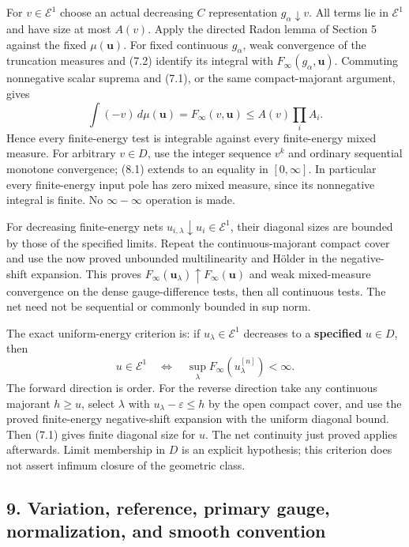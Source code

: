\documentclass[
]{article}
\begin{document}
For \(v\in\mathcal E^1\) choose an actual decreasing \(C\)
representation \(g_\alpha\downarrow v\). All terms lie in
\(\mathcal E^1\) and have size at most \(A(v)\). Apply the directed
Radon lemma of Section 5 against the fixed \(\mu(\boldsymbol u)\). For
fixed continuous \(g_\alpha\), weak convergence of the truncation
measures and (7.2) identify its integral with
\(F_\infty(g_\alpha,\boldsymbol u)\). Commuting nonnegative scalar
suprema and (7.1), or the same compact-majorant argument, gives
\[\int(-v)\,d\mu(\boldsymbol u)=F_\infty(v,\boldsymbol u)\le A(v)\prod_iA_i.\tag{8.1}\]
Hence every finite-energy test is integrable against every finite-energy
mixed measure. For arbitrary \(v\in D\), use the integer sequence
\(v^k\) and ordinary sequential monotone convergence; (8.1) extends to
an equality in \([0,\infty]\). In particular every finite-energy input
pole has zero mixed measure, since its nonnegative integral is finite.
No \(\infty-\infty\) operation is made.

For decreasing finite-energy nets
\(u_{i,\lambda}\downarrow u_i\in\mathcal E^1\), their diagonal sizes are
bounded by those of the specified limits. Repeat the continuous-majorant
compact cover and use the now proved unbounded multilinearity and Hölder
in the negative-shift expansion. This proves
\(F_\infty(\boldsymbol u_\lambda)\uparrow F_\infty(\boldsymbol u)\) and
weak mixed-measure convergence on the dense gauge-difference tests, then
all continuous tests. The net need not be sequential or commonly bounded
in sup norm.

The exact uniform-energy criterion is: if \(u_\lambda\in\mathcal E^1\)
decreases to a \textbf{specified} \(u\in D\), then
\[u\in\mathcal E^1\quad\Longleftrightarrow\quad\sup_\lambda F_\infty(u_\lambda^{[n]})<\infty.\]
The forward direction is order. For the reverse direction take any
continuous majorant \(h\ge u\), select \(\lambda\) with
\(u_\lambda-\varepsilon\le h\) by the open compact cover, and use the
proved finite-energy negative-shift expansion with the uniform diagonal
bound. Then (7.1) gives finite diagonal size for \(u\). The net
continuity just proved applies afterwards. Limit membership in \(D\) is
an explicit hypothesis; this criterion does not assert infimum closure
of the geometric class.

\subsection{9. Variation, reference, primary gauge, normalization, and
smooth
convention}\label{variation-reference-primary-gauge-normalization-and-smooth-convention}
\end{document}
